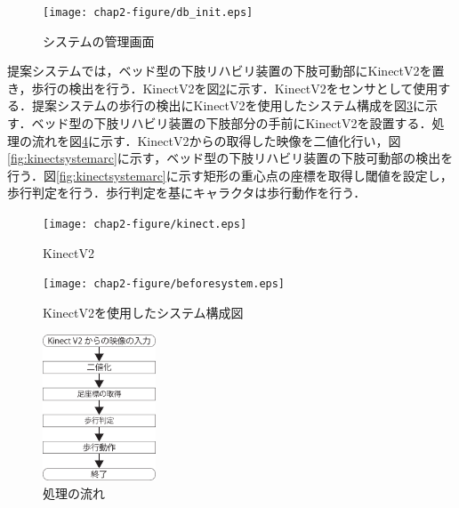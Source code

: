 \begin{figure}[tbp]
	\centering
			\texttt{[image: chap2-figure/db\_init.eps]}
	\caption{システムの管理画面}
	\label{fig:db_init}
\end{figure}


提案システムでは，ベッド型の下肢リハビリ装置の下肢可動部にKinectV2\cite{KinectV2}を置き，歩行の検出を行う．KinectV2を図\ref{fig:kinect}に示す．KinectV2をセンサとして使用する．提案システムの歩行の検出にKinectV2を使用したシステム構成を図\ref{fig:beforesystemarc}に示す．ベッド型の下肢リハビリ装置の下肢部分の手前にKinectV2を設置する．処理の流れを図\ref{fig:片桐1}に示す．KinectV2からの取得した映像を二値化行い，図\ref{fig:kinectsystemarc}に示す，ベッド型の下肢リハビリ装置の下肢可動部の検出を行う．図\ref{fig:kinectsystemarc}に示す矩形の重心点の座標を取得し閾値を設定し，歩行判定を行う．歩行判定を基にキャラクタは歩行動作を行う．

\begin{figure}[tbp]
	\centering
			\texttt{[image: chap2-figure/kinect.eps]}
	\caption{KinectV2}
	\label{fig:kinect}
\end{figure}

\begin{figure}[tbp]
	\centering
			\texttt{[image: chap2-figure/beforesystem.eps]}
	\caption{KinectV2を使用したシステム構成図}
	\label{fig:beforesystemarc}
\end{figure}

\begin{figure}[tbp]
	\centering
			\includegraphics[width=0.3\textwidth]{chap2-figure/katagiri1.eps}
	\caption{処理の流れ}
	\label{fig:片桐1}
\end{figure}

